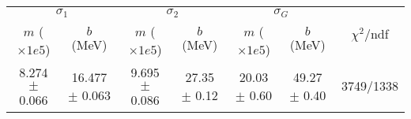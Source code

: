 \begin{tabular}{cc|cc|cc||c}
\multicolumn{2}{c|}{$\sigma_1$} & \multicolumn{2}{|c}{$\sigma_2$} & \multicolumn{2}{|c}{$\sigma_G$}  & \multirow{2}{*}{$\chi^2/$ndf}\\
$m$ ($\times1e5$) & $b$ (MeV) & $m$ ($\times1e5$) & $b$ (MeV) & $m$ ($\times1e5$) & $b$ (MeV) & \\
\hline
8.274 $\pm$ 0.066 & 16.477 $\pm$ 0.063 & 9.695 $\pm$ 0.086 & 27.35 $\pm$ 0.12 & 20.03 $\pm$ 0.60 & 49.27 $\pm$ 0.40 & 3749/1338\\
\end{tabular}
